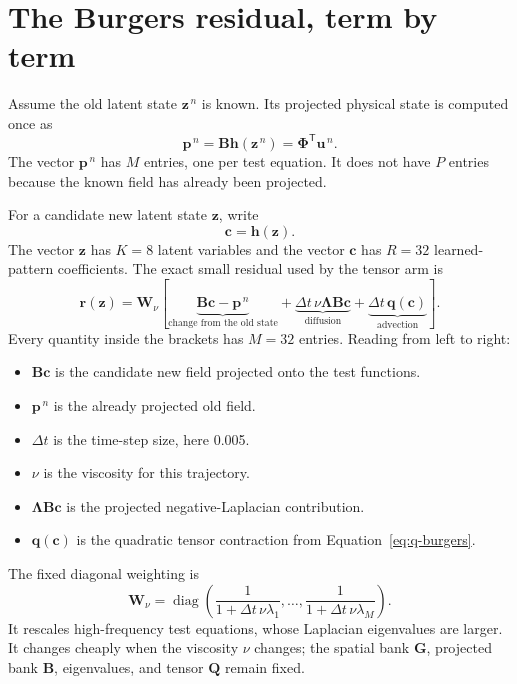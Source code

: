 \documentclass[11pt]{article}
\newcommand{\mat}[1]{\mathbf{#1}}
\newcommand{\vect}[1]{\mathbf{#1}}
\begin{document}
\section{The Burgers residual, term by term}

Assume the old latent state $\vect{z}^{\,n}$ is known.  Its projected physical
state is computed once as
\begin{equation}
  \vect{p}^{\,n}
  =\mat{B}\vect{h}(\vect{z}^{\,n})
  =\mat{\Phi}^{\mathsf T}\vect{u}^{\,n}.
\end{equation}
The vector $\vect{p}^{\,n}$ has $M$ entries, one per test equation.  It does
not have $P$ entries because the known field has already been projected.

For a candidate new latent state $\vect{z}$, write
\begin{equation}
  \vect{c}=\vect{h}(\vect{z}).
\end{equation}
The vector $\vect{z}$ has $K=8$ latent variables and the vector $\vect{c}$ has
$R=32$ learned-pattern coefficients.  The exact small residual used by the
tensor arm is
\begin{equation}
\boxed{
  \vect{r}(\vect{z})
  =\mat{W}_{\nu}\left[
      \underbrace{\mat{B}\vect{c}-\vect{p}^{\,n}}_{\text{change from the old state}}
      +\underbrace{\Delta t\,\nu\mat{\Lambda}\mat{B}\vect{c}}_{\text{diffusion}}
      +\underbrace{\Delta t\,\vect{q}(\vect{c})}_{\text{advection}}
    \right].
}
\label{eq:burgers-small-residual}
\end{equation}
Every quantity inside the brackets has $M=32$ entries.  Reading from left to
right:
\begin{itemize}
  \item $\mat{B}\vect{c}$ is the candidate new field projected onto the test
        functions.
  \item $\vect{p}^{\,n}$ is the already projected old field.
  \item $\Delta t$ is the time-step size, here 0.005.
  \item $\nu$ is the viscosity for this trajectory.
  \item $\mat{\Lambda}\mat{B}\vect{c}$ is the projected negative-Laplacian
        contribution.
  \item $\vect{q}(\vect{c})$ is the quadratic tensor contraction from
        Equation~\eqref{eq:q-burgers}.
\end{itemize}

The fixed diagonal weighting is
\begin{equation}
  \mat{W}_{\nu}
  =\operatorname{diag}\!\left(
      \frac{1}{1+\Delta t\,\nu\lambda_1},\ldots,
      \frac{1}{1+\Delta t\,\nu\lambda_M}
    \right).
\end{equation}
It rescales high-frequency test equations, whose Laplacian eigenvalues are
larger.  It changes cheaply when the viscosity $\nu$ changes; the spatial bank
$\mat{G}$, projected bank $\mat{B}$, eigenvalues, and tensor $\mat{Q}$ remain
fixed.
\end{document}
